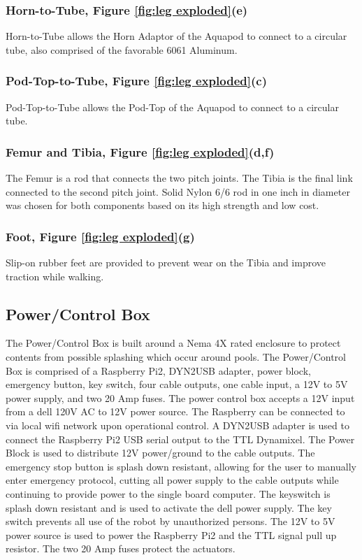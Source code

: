 \subsubsection{Horn-to-Tube, Figure \ref{fig:leg exploded}(e)}
Horn-to-Tube allows the Horn Adaptor of the Aquapod to connect to a circular tube, also comprised of the favorable 6061 Aluminum.

\subsubsection{Pod-Top-to-Tube, Figure \ref{fig:leg exploded}(c)}
Pod-Top-to-Tube allows the Pod-Top of the Aquapod to connect to a circular tube.  


\subsubsection{Femur and Tibia, Figure \ref{fig:leg exploded}(d,f)}
The Femur is a rod that connects the two pitch joints. The Tibia is the final link connected to the second pitch joint. Solid Nylon 6/6 rod in one inch in diameter was chosen for both components based on its high strength and low cost.

\subsubsection{Foot, Figure \ref{fig:leg exploded}(g)}
Slip-on rubber feet are provided to prevent wear on the Tibia and improve traction while walking. 

 

\subsection{Power/Control Box}
The Power/Control Box is built around a Nema 4X rated enclosure to protect contents from possible splashing which occur around pools. The Power/Control Box is comprised of a Raspberry Pi2, DYN2USB adapter, power block, emergency button, key switch, four cable outputs, one cable input, a 12V to 5V power supply, and two 20 Amp fuses. The power control box accepts a 12V input from a dell 120V AC to 12V power source.
The Raspberry can be connected to via local wifi network upon operational control. 
A DYN2USB adapter is used to connect the Raspberry Pi2 USB serial output to the TTL Dynamixel. 
The Power Block is used to distribute 12V power/ground to the cable outputs.
The emergency stop button is splash down resistant, allowing for the user to manually enter emergency protocol, cutting all power supply to the cable outputs while continuing to provide power to the single board computer.
The keyswitch is splash down resistant and is used to activate the dell power supply. The key switch prevents all use of the robot by unauthorized persons. The 12V to 5V power source is used to power the Raspberry Pi2 and the TTL signal pull up resistor.
The two 20 Amp fuses protect the actuators.


